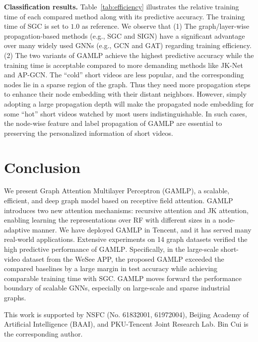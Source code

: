 \documentclass[sigconf]{acmart}
\newcommand{\sys}{\textsc{GAMLP}\xspace}
\begin{document}
\noindent\textbf{Classification results.} Table~\ref{tab:efficiency} illustrates the relative training time of each compared method along with its predictive accuracy.
The training time of SGC is set to $1.0$ as reference.
We observe that (1) The graph/layer-wise propagation-based methods (e.g., SGC and SIGN) have a significant advantage over many widely used GNNs (e.g., GCN and GAT) regarding training efficiency.
(2) The two variants of GAMLP achieve the highest predictive accuracy while the training time is acceptable compared to more demanding methods like JK-Net and AP-GCN.
The ``cold'' short videos are less popular, and the corresponding nodes lie in a sparse region of the graph. Thus they need more propagation steps to enhance their node embedding with their distant neighbors. However, simply adopting a large propagation depth will make the propagated node embedding for some ``hot'' short videos watched by most users indistinguishable.
In such cases, the node-wise feature and label propagation of \sys are essential to preserving the personalized information of short videos.


\section{Conclusion}
We present Graph Attention Multilayer Perceptron (GAMLP), a scalable, efficient, and deep graph model based on receptive field attention. 
GAMLP introduces two new attention mechanisms: recursive attention and JK attention, enabling learning the representations over RF with different sizes in a node-adaptive manner. We have deployed \sys in Tencent, and it has served many real-world applications.
Extensive experiments on 14 graph datasets verified the high predictive performance of \sys. Specifically, in the large-scale short-video dataset from the WeSee APP, the proposed \sys exceeded the compared baselines by a large margin in test accuracy while achieving comparable training time with SGC.
\sys moves forward the performance boundary of scalable GNNs, especially on large-scale and sparse industrial graphs.

\begin{acks}
This work is supported by NSFC (No. 61832001, 61972004), Beijing Academy of Artificial Intelligence (BAAI), and PKU-Tencent Joint Research Lab. Bin Cui is the corresponding author.
\end{acks}





\end{document}
